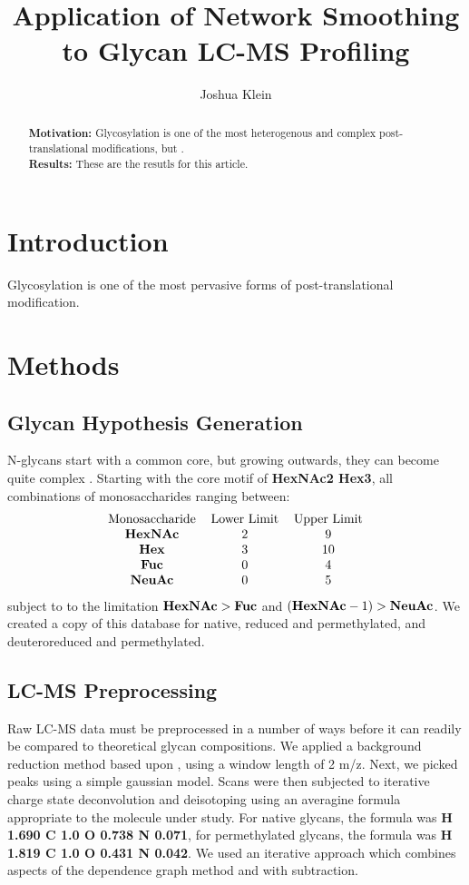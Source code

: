 \documentclass{article}
\begin{document}
\title{Application of Network Smoothing to Glycan LC-MS Profiling}
\author{Joshua Klein}
\begin{abstract}
    \textbf{Motivation:} Glycosylation is one of the most heterogenous
    and complex post-translational modifications, but .\\
    \textbf{Results:} These are the resutls for this article.\\
\end{abstract}

\maketitle

\section{Introduction}
Glycosylation is one of the most pervasive forms of post-translational
modification.


\section{Methods}

\subsection{Glycan Hypothesis Generation}
N-glycans start with a common core, but growing outwards, they can become quite
complex \cite{Stanley2009}. Starting with the core motif of {\bf HexNAc2 Hex3}, all
combinations of monosaccharides ranging between:$$
\begin{tabular}{c c c}
    Monosaccharide & Lower Limit & Upper Limit \\
    {\bf HexNAc} & 2 & 9 \\
    {\bf Hex} & 3 & 10 \\
    {\bf Fuc} & 0 & 4 \\
    {\bf NeuAc} & 0 & 5 \\
\end{tabular}
$$subject to to the limitation ${\bf HexNAc} > {\bf Fuc}$ and $({\bf HexNAc} - 1) > 
{\bf NeuAc}$. We created a copy of this database for native, reduced and permethylated,
and deuteroreduced and permethylated.

\subsection{LC-MS Preprocessing}
Raw LC-MS data must be preprocessed in a number of ways before it can readily be
compared to theoretical glycan compositions. We applied a background reduction
method based upon \cite{Kaur2006}, using a window length of 2 m/z. Next, we picked
peaks using a simple gaussian model. Scans were then subjected to iterative charge
state deconvolution and deisotoping using an averagine \cite{Senko1995} formula
appropriate to the molecule under study. For native glycans, the formula was
{\bf H 1.690 C 1.0 O 0.738 N 0.071}, for permethylated glycans, the formula was
{\bf H 1.819 C 1.0 O 0.431 N 0.042}. We used an iterative approach which combines
aspects of the dependence graph method \cite{Liu2010} and with subtraction. 
\end{document}
